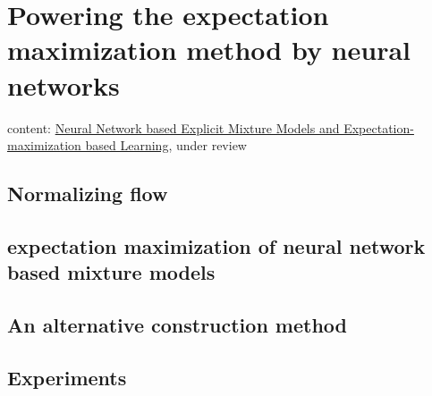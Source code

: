 \chapter{Powering the expectation maximization method by neural networks}
content: \href{https://arxiv.org/abs/1907.13432}{Neural Network based Explicit Mixture Models and Expectation-maximization based Learning}, under review

\section{Normalizing flow}

\section{expectation maximization of neural network based mixture models}

\section{An alternative construction method}

\section{Experiments}



